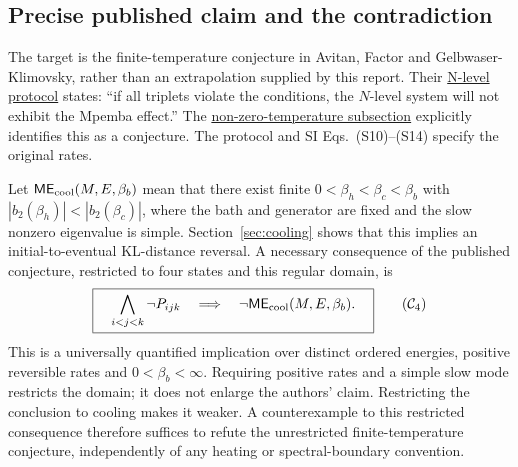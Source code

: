 \documentclass[11pt]{article}
\begin{document}
\subsection{Precise published claim and the contradiction}\label{sec:claimscope}
The target is the finite-temperature conjecture in Avitan, Factor and Gelbwaser-Klimovsky, rather than an extrapolation supplied by this report. Their \href{https://arxiv.org/html/2603.04567v1#Sx3}{N-level protocol} states: ``if all triplets violate the conditions, the $N$-level system will not exhibit the Mpemba effect.'' The \href{https://arxiv.org/html/2603.04567v1#Sx3.SSx2}{non-zero-temperature subsection} explicitly identifies this as a conjecture. The protocol and SI Eqs.~(S10)--(S14) specify the original rates.

Let $\mathsf{ME}_{\rm cool}(M,E,\beta_b)$ mean that there exist finite $0<\beta_h<\beta_c<\beta_b$ with $|b_2(\beta_h)|<|b_2(\beta_c)|$, where the bath and generator are fixed and the slow nonzero eigenvalue is simple. Section~\ref{sec:cooling} shows that this implies an initial-to-eventual KL-distance reversal. A necessary consequence of the published conjecture, restricted to four states and this regular domain, is
\begin{equation}\label{eq:claimC4}
\boxed{\quad
\bigwedge_{i<j<k}\neg P_{ijk}
\quad\Longrightarrow\quad
\neg\mathsf{ME}_{\rm cool}(M,E,\beta_b).
\quad}\tag{$\mathcal C_4$}
\end{equation}
This is a universally quantified implication over distinct ordered energies, positive reversible rates and $0<\beta_b<\infty$. Requiring positive rates and a simple slow mode restricts the domain; it does not enlarge the authors' claim. Restricting the conclusion to cooling makes it weaker. A counterexample to this restricted consequence therefore suffices to refute the unrestricted finite-temperature conjecture, independently of any heating or spectral-boundary convention.
\end{document}
